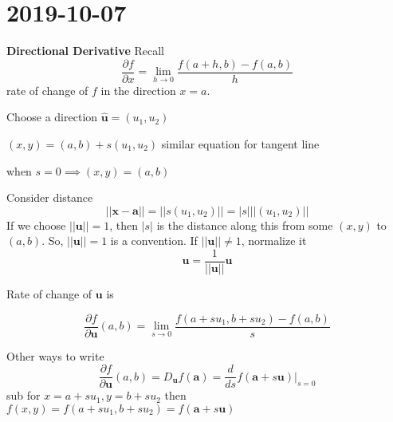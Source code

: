 \section{2019-10-07}
\textbf{Directional Derivative}
Recall
\[ \frac{\partial f}{\partial x} =\lim\limits_{{h} \to {0}} 
\frac{f(a+h,b)-f(a,b)}{h} \]
rate of change of $ f $ in the direction $ x=a $.

Choose a direction $ \bm{\hat{u}}=(u_1,u_2) $
\begin{figure}[ht]
    \centering
\end{figure}

$ (x,y)=(a,b)+s(u_1,u_2) $
similar equation for tangent line

when
$ s=0\implies (x,y)=(a,b) $

Consider distance 
\[ ||\bm{x}-\bm{a}||
=||s(u_1,u_2)||=|s|||(u_1,u_2)|| \]
If we choose $ ||\bm{u}||=1 $, then $ |s| $ is the
distance along this from some $ (x,y) $ to
$ (a,b) $.
So, $ ||\bm{u}||=1 $ is a convention.
If $ ||\bm{u}||\neq 1 $, normalize it
\[ \bm{u}=\frac{1}{||\bm{u}||}\bm{u} \]

\begin{thmbox}
    Rate of change of $\bm{u}$ is

    \[ \frac{\partial f}{\partial \bm{u}}(a,b) =
    \lim\limits_{{s} \to {0}}
    \frac{f(a+su_1,b+su_2)-f(a,b)}{s} \]

\end{thmbox}

Other ways to write
\[ \frac{\partial f}{\partial \bm{u}}(a,b) = 
D_{\bm{u}}f(\bm{a})=\frac{d}{ds}f(\bm{a}+s
\bm{u})\Bigr\rvert_{s=0} \]
sub for $ x=a+su_1, y=b+su_2 $
then $ f(x,y) =f(a+su_1,b+su_2)=f(\bm{a}+s\bm{u})$